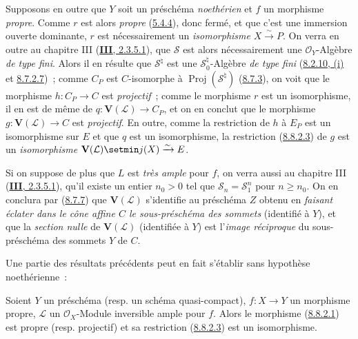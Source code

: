 \begin{remark}[8.8.3]
\label{II.8.8.3-fr}
Supposons en outre que $Y$ soit un préschéma \emph{noethérien} et $f$ un
morphisme \emph{propre}. Comme $r$ est alors \emph{propre}
(\hyperref[II.5.4.4-fr]{5.4.4}), donc fermé, et que c'est une immersion ouverte
dominante, $r$ est nécessairement un \emph{isomorphisme}
$X\xrightarrow{\sim}P$. On verra en outre au chapitre III
(\hyperref[III.2.3.5.1-fr]{\textbf{III}, 2.3.5.1}), que $\mathcal{S}$ est alors
nécessairement une $\mathcal{O}_Y$-Algèbre \emph{de type fini}. Alors il en
résulte que $\mathcal{S}^{\natural}$ est une
$\mathcal{S}_0^{\natural}$-Algèbre \emph{de type fini}
(\hyperref[II.8.2.10-fr]{8.2.10, (i)} et
\hyperref[II.8.7.2.7-fr]{8.7.2.7})~; comme $C_P$ est $C$-isomorphe à
$\operatorname{Proj}(\mathcal{S}^{\natural})$
(\hyperref[II.8.7.3-fr]{8.7.3}), on voit que le morphisme $h:C_P\to C$ est
\emph{projectif}~; comme le morphisme $r$ est un isomorphisme, il en est de
même de $q:\mathbf{V}(\mathcal{L})\to C_P$, et on en conclut que le morphisme
$g:\mathbf{V}(\mathcal{L})\to C$ est \emph{projectif}. En outre, comme la
restriction de $h$ à $E_P$ est un isomorphisme sur $E$ et que $q$ est un
isomorphisme, la restriction (\hyperref[II.8.8.2.3-fr]{8.8.2.3}) de $g$ est un
\emph{isomorphisme}
$\mathbf{V}(\mathcal{L})\setmin j(X)\xrightarrow{\sim}E$.

Si on suppose de plus que $L$ est \emph{très ample} pour $f$, on
verra aussi au chapitre III (\hyperref[III.2.3.5.1-fr]{\textbf{III}, 2.3.5.1}), qu'il
existe un entier $n_0>0$ tel que
$\mathcal{S}_n=\mathcal{S}_1^n$ pour $n\geqslant n_0$. On en conclura par
(\hyperref[II.8.7.7-fr]{8.7.7}) que $\mathbf{V}(\mathcal{L})$ s'identifie au
préschéma $Z$ obtenu en \emph{faisant éclater dans le cône affine $C$ le
sous-préschéma des sommets} (identifié à $Y$), et que la \emph{section nulle}
de $\mathbf{V}(\mathcal{L})$ (identifiée à $Y$) est l'\emph{image réciproque}
du sous-préschéma des sommets $Y$ de $C$.

Une partie des résultats précédents
peut en fait s'établir sans hypothèse noethérienne~:
\end{remark}

\begin{corollary}[8.8.4]
\label{II.8.8.4-fr}
Soient $Y$ un préschéma \textup{(resp.} un schéma quasi-compact\textup{)}, $f:X\to Y$ un
morphisme propre, $\mathcal{L}$ un $\mathcal{O}_X$-Module inversible ample pour
$f$. Alors le morphisme \textup{(\hyperref[II.8.8.2.1-fr]{8.8.2.1})} est propre \textup{(resp.}
projectif\textup{)} et sa restriction \textup{(\hyperref[II.8.8.2.3-fr]{8.8.2.3})} est un
isomorphisme.
\end{corollary}

